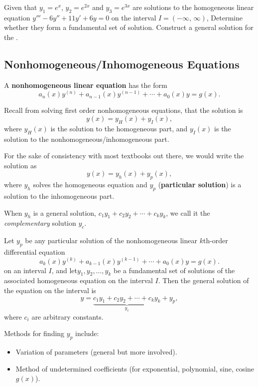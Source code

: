 \begin{example}
  Given that \(y_1=e^x\), \(y_2=e^{2x}\) and \(y_3=e^{3x}\) are solutions to the homogeneous linear equation \(y''' -6y'' + 11y' + 6y =0\) on the interval \(I=(-\infty, \,\infty)\),
  Determine whether they form a fundamental set of solution. Construct a general solution for the \ode{}. 
\end{example}




\subsection{Nonhomogeneous/Inhomogeneous Equations}
A \textbf{nonhomogeneous linear equation} has the form
\[
a_n(x) y^{(n)} + a_{n-1}(x) y^{(n-1)} + \cdots + a_0(x) y = g(x).
\]

Recall from solving first order nonhomogeneous equations, that the solution is
\[
y(x) = y_H(x) + y_I(x),
\]
where \(y_H(x)\) is the solution to the homogeneous part, and \(y_I(x)\) is the solution to the nonhomogeneous/inhomogeneous part.

For the sake of consistency with most textbooks out there, we would write the solution as 
\[
y(x) = y_h(x) + y_p(x),
\]
where $y_h$ solves the homogeneous equation and $y_p$ (\textbf{particular solution}) is a solution to the inhomogeneous part.

When $y_h$ is a general solution, \(c_1y_1 + c_2y_2 + \cdots + c_ky_k \), we call it the \emph{complementary} solution \(y_c\).

\begin{theorem}
   Let \(y_p\) be any particular solution of the nonhomogeneous linear \(k\)th-order differential equation
   \[
    a_k(x) y^{(k)} + a_{k-1}(x) y^{(k-1)} + \cdots + a_0(x) y = g(x).
   \]
   on an interval \(I\), and let\(y_1,y_2,\ldots,y_k\) be a fundamental set of solutions of the associated homogeneous equation
   on the interval \(I\).
   Then the general solution of the equation on the interval is
   \[
   y = \underbrace{c_1y_1 + c_2y_2 + \cdots + c_ky_k}_{y_c}+ y_p,
   \]
   where \(c_i\) are arbitrary constants.
\end{theorem}


Methods for finding $y_p$ include:
\begin{itemize}
  \item Variation of parameters (general but more involved).
  \item Method of undetermined coefficients (for exponential, polynomial, sine, cosine $g(x)$).
\end{itemize}


